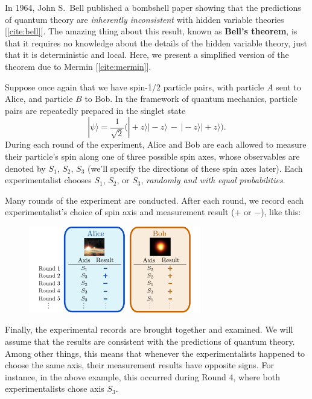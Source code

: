 \documentclass[pra,12pt]{revtex4-2}
\begin{document}
In 1964, John S.~Bell published a bombshell paper showing that the
predictions of quantum theory are \textit{inherently inconsistent}
with hidden variable theories [\ref{cite:bell}].  The amazing thing
about this result, known as \textbf{Bell's theorem}, is that it
requires no knowledge about the details of the hidden variable theory,
just that it is deterministic and local.  Here, we present a
simplified version of the theorem due to Mermin [\ref{cite:mermin}].

Suppose once again that we have spin-1/2 particle pairs, with particle
$A$ sent to Alice, and particle $B$ to Bob.  In the framework of
quantum mechanics, particle pairs are repeatedly prepared in the
singlet state
\begin{equation}
  |\psi\rangle = \frac{1}{\sqrt{2}} \Big(|\!+\!z\rangle|\!-\!z\rangle \,-\, |\!-\!z\rangle|\!+\!z\rangle\Big).
  \label{bellsinglet}
\end{equation}
During each round of the experiment, Alice and Bob are each allowed to
measure their particle's spin along one of three possible spin axes,
whose observables are denoted by $S_1$, $S_2$, $S_3$ (we'll specify
the directions of these spin axes later).  Each experimentalist
chooses $S_1$, $S_2$, or $S_3$, \textit{randomly and with equal
  probabilities}.

Many rounds of the experiment are conducted.  After each round, we
record each experimentalist's choice of spin axis and measurement
result ($+$ or $-$), like this:

\begin{figure}[h]
  \centering\includegraphics[width=0.67\textwidth]{bell}
\end{figure}

Finally, the experimental records are brought together and examined.
We will assume that the results are consistent with the predictions of
quantum theory.  Among other things, this means that whenever the
experimentalists happened to choose the same axis, their measurement
results have opposite signs.  For instance, in the above example, this
occurred during Round 4, where both experimentalists chose axis $S_3$.
\end{document}
